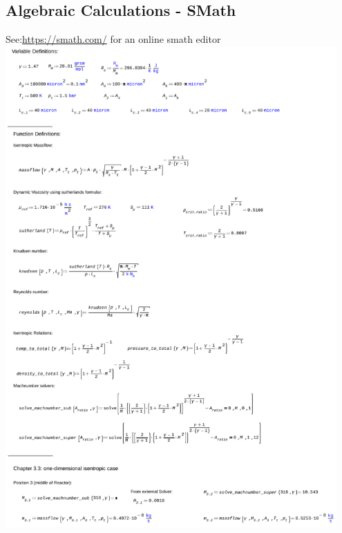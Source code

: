 \subsection{Algebraic Calculations - SMath}
\label{apx:smath}
See:\quad \url{https://smath.com/} for an online smath editor\\

\includegraphics[page=1, width=0.95\textwidth]{code/calculations_thesis.pdf}
\newpage
